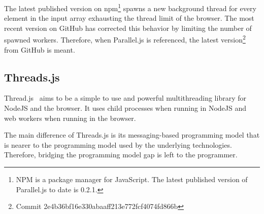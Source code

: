 The latest published version on npm\footnote{NPM is a package manager for JavaScript. The latest published version of Parallel.js to date is 0.2.1.} spawns a new background thread for every element in the input array exhausting the thread limit of the browser. The most recent version on GitHub has corrected this behavior by limiting the number of spawned workers. Therefore, when Parallel.js is referenced, the latest version\footnote{Commit 2e4b36bf16e330abaaff213e772fcf4074fd866b} from GitHub is meant.

\subsection{Threads.js}
Thread.js~\cite{Wermke2016} aims to be a simple to use and powerful multithreading library for NodeJS and the browser. It uses child processes when running in NodeJS and web workers when running in the browser.

The main difference of Threads.js is its messaging-based programming model that is nearer to the programming model used by the underlying technologies. Therefore, bridging the programming model gap is left to the programmer.